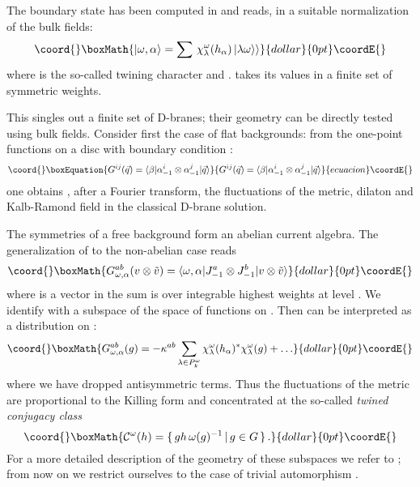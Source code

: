 \documentclass[a4paper,12pt]{article} \usepackage{amssymb,amsfonts,latexsym}
\begin{document}
The boundary state has been computed in \cite{bifs} and reads,
in a suitable normalization of the bulk fields:
$$\coord{}\boxMath{ |\omega,\alpha\rangle = \sum \, \chi_\lambda^\omega(h_\alpha) \,
|\lambda\omega\rangle\rangle }{dollar}{0pt}\coordE{}$$
where \myHighlight{$\chi_\lambda^\omega$}\coordHE{} is the so-called twining character
\cite{fusS3} and \coordHE{}. 
\coordHE{} takes its values in a finite set of symmetric weights.

This singles out a finite set of D-branes; their geometry can be
directly tested using bulk fields. Consider first the case of flat
backgrounds: from the one-point functions on a disc with boundary
condition \myHighlight{$\beta$}\coordHE{}:
\begin{equation}\coord{}\boxEquation{ 
G^{ij} (\vec q) = \langle \beta | \alpha_{-1}^i\otimes \alpha_{-1}^j|\vec 
q\rangle \label1 }{ 
G^{ij} (\vec q) = \langle \beta | \alpha_{-1}^i\otimes \alpha_{-1}^j|\vec 
q\rangle \label1 }{ecuacion}\coordE{}\end{equation}
one obtains \cite{dfpslr}, after a Fourier transform, the fluctuations
of the metric, dilaton and Kalb-Ramond field in the classical D-brane
solution.

The symmetries of a free background form an abelian current algebra.
The generalization of  to the non-abelian case reads
$$\coord{}\boxMath{G^{ab}_{\omega,\alpha} (v\otimes \tilde v) = 
\langle \omega,\alpha| J^a_{-1}\otimes J^b_{-1} | v\otimes \tilde v\rangle
}{dollar}{0pt}\coordE{}$$ 
where \coordHE{} is a vector in
\coordHE{}
the sum is over integrable highest weights at level \coordHE{}. We identify
\coordHE{} with a subspace of the space 
\myHighlight{$ \calf = \oplus_{\lambda} \, \bar\calh_\lambda\otimes \bar\calh_{\lambda^+}$}\coordHE{}
of functions on \coordHE{}. Then \coordHE{} can be interpreted 
\cite{fffs} as a distribution on \coordHE{}:
$$\coord{}\boxMath{ G^{ab}_{\omega,\alpha}(g) = - \kappa^{ab} \sum_{\lambda\in P^\omega_k} 
\chi_\lambda^\omega(h_\alpha)^* \chi_\lambda^\omega(g) + \ldots }{dollar}{0pt}\coordE{}$$
where we have dropped antisymmetric terms. Thus the fluctuations of the
metric are proportional to the Killing form \coordHE{} and
concentrated at the so-called {\em twined conjugacy class}
$$\coord{}\boxMath{ \calc^\omega(h) = \{ \, g h \,\omega(g)^{-1}\,  |\,  g\in G \, \} \,. }{dollar}{0pt}\coordE{}$$
For a more detailed description of the geometry of these subspaces we
refer to \cite{fffs}; from now on we restrict ourselves to the
case of trivial automorphism \coordHE{}.
\end{document}

